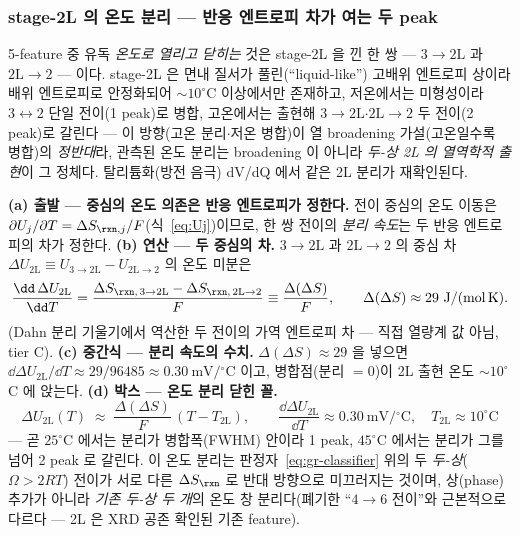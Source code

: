 \subsubsection{stage-2L 의 온도 분리 --- 반응 엔트로피 차가 여는 두 peak}\label{ssec:gr-2L-tsplit}
5-feature 중 유독 \emph{온도로 열리고 닫히는} 것은 stage-2L 을 낀 한 쌍 --- $3\!\to\!2\mathrm L$ 과
$2\mathrm L\!\to\!2$ --- 이다. stage-2L 은 면내 질서가 풀린(``liquid-like'') 고배위 엔트로피 상이라 배위
엔트로피로 안정화되어 $\sim\!10^\circ$C 이상에서만 존재하고, 저온에서는 미형성이라 $3\!\leftrightarrow\!2$ 단일
전이(1 peak)로 병합, 고온에서는 출현해 $3\!\to\!2\mathrm L$$\cdot$$2\mathrm L\!\to\!2$ 두 전이(2 peak)로 갈린다
--- 이 방향(고온 분리$\cdot$저온 병합)이 열 broadening 가설(고온일수록 병합)의 \emph{정반대}라, 관측된 온도
분리는 broadening 이 아니라 \emph{두-상 2L 의 열역학적 출현}이 그 정체다\cite{dahn1991}. 탈리튬화(방전 음극)
dV/dQ 에서 같은 2L 분리가 재확인된다\cite{schmitt2022}.

\textbf{(a) 출발 --- 중심의 온도 의존은 반응 엔트로피가 정한다.} 전이 중심의 온도 이동은
$\partial U_j/\partial T=\Delta S_{\rxn,j}/F$(식~\eqref{eq:Uj})이므로, 한 쌍 전이의 \emph{분리 속도}는 두 반응
엔트로피의 차가 정한다. \textbf{(b) 연산 --- 두 중심의 차.} $3\!\to\!2\mathrm L$ 과 $2\mathrm L\!\to\!2$ 의
중심 차 $\Delta U_{\mathrm{2L}}\equiv U_{3\to2\mathrm L}-U_{2\mathrm L\to2}$ 의 온도 미분은
\begin{equation}
\frac{\dd\,\Delta U_{\mathrm{2L}}}{\dd T}
=\frac{\Delta S_{\rxn,\,3\to2\mathrm L}-\Delta S_{\rxn,\,2\mathrm L\to2}}{F}
\equiv\frac{\Delta(\Delta S)}{F},
\qquad
\Delta(\Delta S)\approx29\ \mathrm{J/(mol\,K)}.
\label{eq:gr-2L-dSsplit}
\end{equation}
(Dahn 분리 기울기에서 역산한 두 전이의 가역 엔트로피 차 --- 직접 열량계 값 아님, tier C). \textbf{(c) 중간식 ---
분리 속도의 수치.} $\Delta(\Delta S)\approx29$ 을 넣으면 $\dd\Delta U_{\mathrm{2L}}/\dd T\approx29/96485
\approx0.30\ \mathrm{mV/{}^\circ C}$ 이고, 병합점(분리 $=0$)이 2L 출현 온도 $\sim\!10^\circ$C 에 앉는다.
\textbf{(d) 박스 --- 온도 분리 닫힌 꼴.}
\begin{equation}
\boxed{\;
\Delta U_{\mathrm{2L}}(T)\;\approx\;\frac{\Delta(\Delta S)}{F}\,(T-T_{\mathrm{2L}}),
\qquad
\frac{\dd\Delta U_{\mathrm{2L}}}{\dd T}\approx0.30\ \mathrm{mV/{}^\circ C},
\quad T_{\mathrm{2L}}\approx10^\circ\mathrm C\;}
\label{eq:gr-2L-slope}
\end{equation}
--- 곧 $25^\circ$C 에서는 분리가 병합폭(FWHM) 안이라 1 peak, $45^\circ$C 에서는 분리가 그를 넘어 2 peak 로
갈린다. 이 온도 분리는 판정자~\eqref{eq:gr-classifier} 위의 두 \emph{두-상}($\Omega>2RT$) 전이가 서로 다른
$\Delta S_\rxn$ 로 반대 방향으로 미끄러지는 것이며, 상(phase) 추가가 아니라 \emph{기존 두-상 두 개}의 온도 창
분리다(폐기한 ``$4\!\to\!6$ 전이''와 근본적으로 다르다 --- 2L 은 XRD 공존 확인된 기존 feature).

